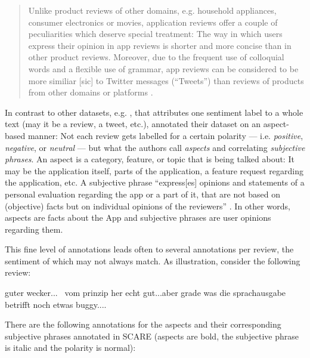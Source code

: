\begin{quote}
  Unlike product reviews of other domains, e.g. household appliances, consumer electronics or
  movies, application reviews offer a couple of peculiarities which deserve special treatment:
  The way in which users express their opinion in app reviews is shorter and more concise than
  in other product reviews. Moreover, due to the frequent use of colloquial words and a flexible
  use of grammar, app reviews can be considered to be more similiar [sic] to Twitter messages
  (“Tweets”) than reviews of products from other domains or platforms \textelp{}.
\end{quote}

In contrast to other datasets, e.g. \citep{socher2013recursive, go2009twitter},
that attributes one sentiment label to a whole text (may it be a review, a tweet,
etc.), \cite{sanger2016scare} annotated their dataset on an aspect-based manner:
Not each review gets labelled for a certain polarity --- i.e. \emph{positive},
\emph{negative}, or \emph{neutral} --- but what the authors call \emph{aspects} and
correlating \emph{subjective phrases}. An aspect is a category, feature, or
topic that is being talked about: It may be the application itself, parts of the
application, a feature request regarding the application, etc. A subjective phrase
``express[es] opinions and statements of a personal evaluation regarding the app or
a part of it, that are not based on (objective) facts but on individual opinions of
the reviewers'' \citep[p.~1116]{sanger2016scare}. In other words, aspects are facts
about the App and subjective phrases are user opinions regarding them.

This fine level of annotations leads often to several annotations per review, the sentiment of
which may not always match.
As illustration, consider the following review:

\begin{examples}
  \label{ex:fine-grained-anno}
  \item guter wecker... \textbar\textbar\ vom prinzip her echt gut...aber grade was die sprachausgabe betrifft noch etwas buggy....
\end{examples}

There are the following annotations for the aspects and their corresponding subjective
phrases annotated in SCARE (aspects are bold, the subjective phrase is italic and the
polarity is normal):


